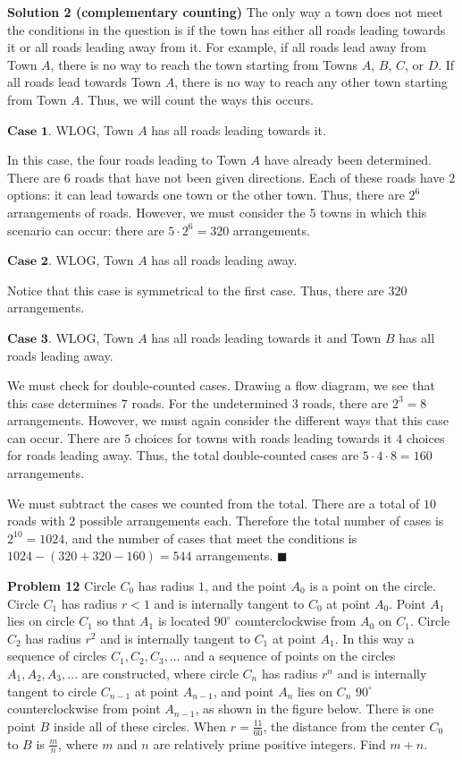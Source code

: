 \documentclass[a4paper,11pt]{article}
\begin{document}
\textbf{Solution 2 (complementary counting)}
The only way a town does not meet the conditions in the question is if the town has either all roads leading towards it or all roads leading away from it. For example, if all roads lead away from Town $A$, there is no way to reach the town starting from Towns $A$, $B$, $C$, or $D$. If all roads lead towards Town $A$, there is no way to reach any other town starting from Town $A$. Thus, we will count the ways this occurs.


$\textbf{Case 1}$. WLOG, Town $A$ has all roads leading towards it.

In this case, the four roads leading to Town $A$ have already been determined. There are $6$ roads that have not been given directions. Each of these roads have $2$ options: it can lead towards one town or the other town. Thus, there are $2^6$ arrangements of roads. However, we must consider the $5$ towns in which this scenario can occur: there are $5 \cdot 2^6=320$ arrangements.


$\textbf{Case 2}$. WLOG, Town $A$ has all roads leading away.

Notice that this case is symmetrical to the first case. Thus, there are $320$ arrangements.


$\textbf{Case 3}$. WLOG, Town $A$ has all roads leading towards it and Town $B$ has all roads leading away.

We must check for double-counted cases. Drawing a flow diagram, we see that this case determines $7$ roads. For the undetermined $3$ roads, there are $2^3=8$ arrangements. However, we must again consider the different ways that this case can occur. There are $5$ choices for towns with roads leading towards it $4$ choices for roads leading away. Thus, the total double-counted cases are $5 \cdot 4 \cdot 8=160$ arrangements.

We must subtract the cases we counted from the total. There are a total of $10$ roads with $2$ possible arrangements each. Therefore the total number of cases is $2^{10} =1024$, and the number of cases that meet the conditions is $1024 - (320+320-160) = \boxed{544}$ arrangements. \hfill $\blacksquare$

\textbf{Problem 12}
Circle $C_0$ has radius $1$, and the point $A_0$ is a point on the circle. Circle $C_1$ has radius $r<1$ and is internally tangent to $C_0$ at point $A_0$. Point $A_1$ lies on circle $C_1$ so that $A_1$ is located $90^{\circ}$ counterclockwise from $A_0$ on $C_1$. Circle $C_2$ has radius $r^2$ and is internally tangent to $C_1$ at point $A_1$. In this way a sequence of circles $C_1,C_2,C_3,\ldots$ and a sequence of points on the circles $A_1,A_2,A_3,\ldots$ are constructed, where circle $C_n$ has radius $r^n$ and is internally tangent to circle $C_{n-1}$ at point $A_{n-1}$, and point $A_n$ lies on $C_n$ $90^{\circ}$ counterclockwise from point $A_{n-1}$, as shown in the figure below. There is one point $B$ inside all of these circles. When $r = \frac{11}{60}$, the distance from the center $C_0$ to $B$ is $\frac{m}{n}$, where $m$ and $n$ are relatively prime positive integers. Find $m+n$.
\end{document}
